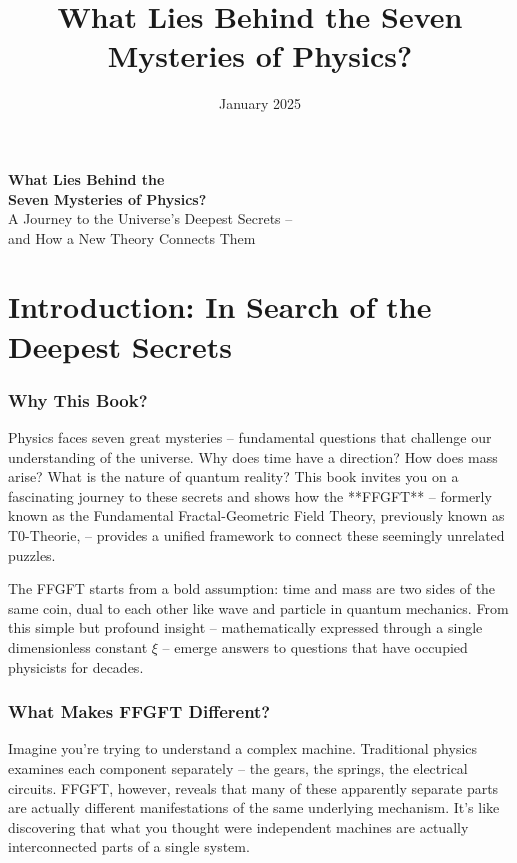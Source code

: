 \documentclass[11pt,openright,twoside]{book}
\title{What Lies Behind the Seven Mysteries of Physics?}
\author{}
\date{January 2025}
\begin{document}
\pagestyle{plain}
\begin{center}
\vspace*{2cm}
{\Huge\textbf{What Lies Behind the\\Seven Mysteries of Physics?}}\\[1.5cm]
{\Large A Journey to the Universe's Deepest Secrets –\\and How a New Theory Connects Them}\\[2cm]
\end{center}
\frontmatter
\pagestyle{fancy}
\tableofcontents
\mainmatter
\pagestyle{fancy}


\chapter*{Introduction: In Search of the Deepest Secrets}

\subsection*{Why This Book?}

Physics faces seven great mysteries – fundamental questions that challenge our understanding of the universe. Why does time have a direction? How does mass arise? What is the nature of quantum reality? This book invites you on a fascinating journey to these secrets and shows how the **FFGFT** – formerly known as the Fundamental Fractal-Geometric Field Theory, previously known as  T0-Theorie, – provides a unified framework to connect these seemingly unrelated puzzles.

The FFGFT starts from a bold assumption: time and mass are two sides of the same coin, dual to each other like wave and particle in quantum mechanics. From this simple but profound insight – mathematically expressed through a single dimensionless constant \(\xi\) – emerge answers to questions that have occupied physicists for decades.

\subsection*{What Makes FFGFT Different?}

Imagine you're trying to understand a complex machine. Traditional physics examines each component separately – the gears, the springs, the electrical circuits. FFGFT, however, reveals that many of these apparently separate parts are actually different manifestations of the same underlying mechanism. It's like discovering that what you thought were independent machines are actually interconnected parts of a single system.
\end{document}
